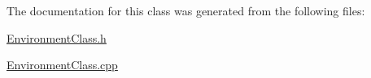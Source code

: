 The documentation for this class was generated from the following files\-:\begin{DoxyCompactItemize}
\item 
\hyperlink{EnvironmentClass_8h}{Environment\-Class.\-h}\item 
\hyperlink{EnvironmentClass_8cpp}{Environment\-Class.\-cpp}\end{DoxyCompactItemize}
